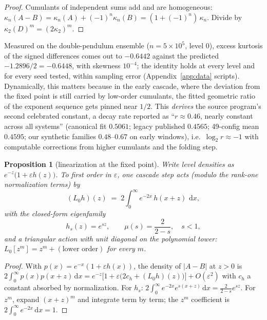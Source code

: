 \documentclass[11pt,a4paper]{article}
\newtheorem{proposition}{Proposition}
\theoremstyle{remark}
\newcommand{\dd}{\,\mathrm{d}}
\begin{document}
\begin{proof}
Cumulants of independent sums add and are homogeneous: $\kappa_n(A - B) = \kappa_n(A) +
(-1)^n \kappa_n(B) = (1 + (-1)^n)\,\kappa_n$. Divide by $\kappa_2(D)^m = (2\kappa_2)^m$.
\end{proof}

Measured on the double-pendulum ensemble ($n = 5\times10^{5}$, level 0), excess kurtosis of the
signed differences comes out to $-0.6442$ against the predicted $-1.2896/2 = -0.6448$, with skewness
$10^{-4}$; the identity holds at every level and for every seed tested, within sampling error
(Appendix~\ref{app:data} scripts). Dynamically, this matters because in the early cascade, where the
deviation from the fixed point is still carried by low-order cumulants, the fitted geometric ratio of
the exponent sequence gets pinned near $1/2$. This \emph{derives} the source program's second
celebrated constant, a decay rate reported as ``$r \approx 0.46$, nearly constant across all
systems'' (canonical fit $0.5061$; legacy published $0.4565$; 49-config mean $0.4595$; our synthetic
families $0.48$--$0.67$ on early windows), i.e.\ $\log_2 r \approx -1$ with computable corrections
from higher cumulants and the folding step.

\begin{proposition}[linearization at the fixed point]\label{prop:linop}
Write level densities as $e^{-z}\bigl(1 + \varepsilon h(z)\bigr)$. To first order in
$\varepsilon$, one cascade step acts (modulo the rank-one normalization terms) by
\begin{equation}\label{eq:linop}
(L_0 h)(z) \;=\; 2\int_0^\infty e^{-2x}\, h(x + z)\,\dd x ,
\end{equation}
with the closed-form eigenfamily
\begin{equation}
h_s(z) = e^{s z}, \qquad \mu(s) = \frac{2}{2 - s}, \quad s < 1,
\end{equation}
and a triangular action with \emph{unit diagonal} on the polynomial tower:
$L_0[z^m] = z^m + (\text{lower order})$ for every $m$.
\end{proposition}

\begin{proof}
With $p(x) = e^{-x}(1 + \varepsilon h(x))$, the density of $|A - B|$ at $z > 0$ is
$2\int_0^\infty p(x) p(x + z)\dd x = e^{-z}\bigl[1 + \varepsilon\bigl(2c_h + (L_0h)(z)\bigr)\bigr] +
O(\varepsilon^2)$ with $c_h$ a constant absorbed by normalization. For $h_s$:
$2\int_0^\infty e^{-2x} e^{s(x+z)}\dd x = \tfrac{2}{2-s} e^{sz}$. For $z^m$, expand
$(x + z)^m$ and integrate term by term; the $z^m$ coefficient is $2\int_0^\infty e^{-2x}\dd x = 1$.
\end{proof}
\end{document}
